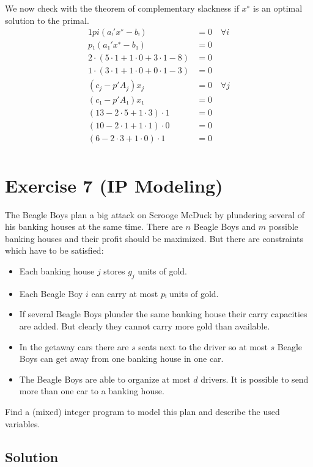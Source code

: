 \documentclass[a4paper, 12pt]{report}
\begin{document}
We now check with the theorem of complementary slackness if $x^∗$ is an optimal
solution to the primal.
\begin{alignat*}{1}
    pi(aᵢ′x^∗−bᵢ)           &= 0 \quad ∀i\\
    p₁(a₁′x^∗-b₁)           &= 0\\[5pt]
    2·(5·1 + 1·0 + 3·1 - 8) &= 0\\
    1·(3·1 + 1·0 + 0·1 - 3) &= 0\\[10pt]
    (c_j − p′A_j)x_j        &= 0 \quad∀j\\
    (c₁ − p′A₁)x₁           &= 0\\[5pt]
    (13 − 2·5 + 1·3) · 1    &= 0\\
    (10 − 2·1 + 1·1) · 0    &= 0\\
    ( 6 − 2·3 + 1·0) · 1    &= 0\\
\end{alignat*}

\section{Exercise 7 (IP Modeling)}

The Beagle Boys plan a big attack on Scrooge McDuck by plundering several of
his banking houses at the same time. There are $n$ Beagle Boys and $m$ possible
banking houses and their profit should be maximized. But there are constraints
which have to be satisfied:

\begin{itemize}
    \item Each banking house $j$ stores $g_j$ units of gold.
    \item Each Beagle Boy $i$ can carry at most $pᵢ$ units of gold.
    \item If several Beagle Boys plunder the same banking house their carry
          capacities are added. But clearly they cannot carry more gold than
          available.
    \item In the getaway cars there are $s$ seats next to the driver so at most
          $s$ Beagle Boys can get away from one banking house in one car.
    \item The Beagle Boys are able to organize at most $d$ drivers. It is
          possible to send more than one car to a banking house.
\end{itemize}

Find a (mixed) integer program to model this plan and describe the used
variables.

\subsection{Solution}
\end{document}
